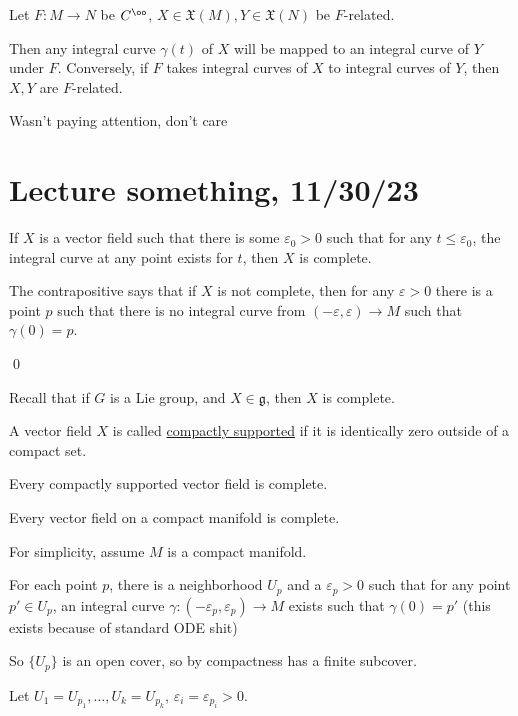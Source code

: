 \documentclass[x11names,reqno,14pt]{extarticle}
\newcommand{\mk}[1]{\mathfrak{#1}}
\begin{document}
\prop

Let $F:M\to N$ be $C^\oo$, $X \in \mk{X}(M), Y \in \mk{X}(N)$ be $F$-related. 

Then any integral curve $\gamma(t)$ of $X$ will be mapped to an integral curve of $Y$ under $F$. Conversely, if $F$ takes integral curves of $X$ to integral curves of $Y$, then $X, Y$ are $F$-related.

\proof

Wasn't paying attention, don't care

\section*{Lecture something, 11/30/23}


If $X$ is a vector field such that there is some $\varepsilon_0>0$ such that for any $t \leq \varepsilon_0$, the integral curve at any point exists for $t$, then $X$ is complete. 

The contrapositive says that if $X$ is not complete, then for any $\varepsilon>0$ there is a point $p$ such that there is no integral curve from $(-\varepsilon,\varepsilon)\to M$ such that $\gamma(0) = p$. 

\proof

\qed

Recall that if $G$ is a Lie group, and $X \in \mk{g}$, then $X$ is complete. 


A vector field $X$ is called \underline{compactly supported} if it is identically zero outside of a compact set. 

\thm

Every compactly supported vector field is complete. 

\cor

Every vector field on a compact manifold is complete. 

\proof

For simplicity, assume $M$ is a compact manifold. 

For each point $p$, there is a neighborhood $U_p$ and a $\varepsilon_p>0$ such that for any point $p' \in U_p$, an integral curve $\gamma:(-\varepsilon_p,\varepsilon_p)\to M$ exists such that $\gamma(0) = p'$ (this exists because of standard ODE shit)

So $\{U_p\}$ is an open cover, so by compactness has a finite subcover. 

Let $U_1 = U_{p_1}, \dots, U_k = U_{p_k}$, $\varepsilon_i = \varepsilon_{p_i}>0$. 
\end{document}
